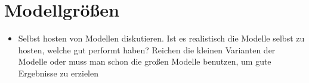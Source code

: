 \section{Modellgrößen}\label{sec:modellgroen}

\begin{itemize}
    \item Selbst hosten von Modellen diskutieren. Ist es realistisch die Modelle selbst zu hosten, welche gut performt haben? Reichen die kleinen Varianten der Modelle oder muss man schon die großen Modelle benutzen, um gute Ergebnisse zu erzielen
\end{itemize}